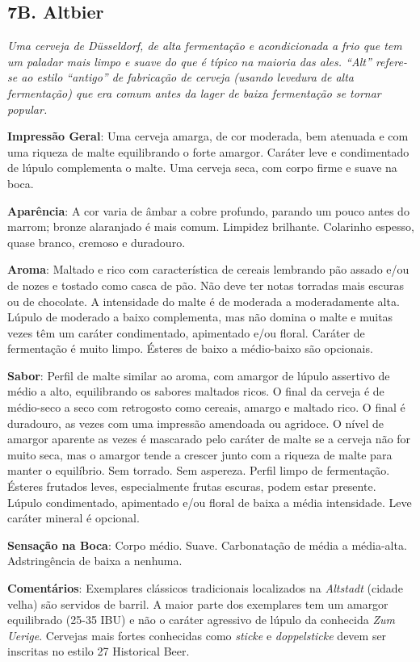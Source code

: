 \subsection*{7B. Altbier}
\textit{Uma cerveja de Düsseldorf, de alta fermentação e acondicionada a frio que tem um paladar mais limpo e suave do que é típico na maioria das ales. “Alt” refere-se ao estilo “antigo” de fabricação de cerveja (usando levedura de alta fermentação) que era comum antes da lager de baixa fermentação se tornar popular.}

\textbf{Impressão Geral}: Uma cerveja amarga, de cor moderada, bem atenuada e com uma riqueza de malte equilibrando o forte amargor. Caráter leve e condimentado de lúpulo complementa o malte. Uma cerveja seca, com corpo firme e suave na boca.

\textbf{Aparência}: A cor varia de âmbar a cobre profundo, parando um pouco antes do marrom; bronze alaranjado é mais comum. Limpidez brilhante. Colarinho espesso, quase branco, cremoso e duradouro.

\textbf{Aroma}: Maltado e rico com característica de cereais lembrando pão assado e/ou de nozes e tostado como casca de pão. Não deve ter notas torradas mais escuras ou de chocolate. A intensidade do malte é de moderada a moderadamente alta. Lúpulo de moderado a baixo complementa, mas não domina o malte e muitas vezes têm um caráter condimentado, apimentado e/ou floral. Caráter de fermentação é muito limpo. Ésteres de baixo a médio-baixo são opcionais.

\textbf{Sabor}: Perfil de malte similar ao aroma, com amargor de lúpulo assertivo de médio a alto, equilibrando os sabores maltados ricos. O final da cerveja é de médio-seco a seco com retrogosto como cereais, amargo e maltado rico. O final é duradouro, as vezes com uma impressão amendoada ou agridoce. O nível de amargor aparente as vezes é mascarado pelo caráter de malte se a cerveja não for muito seca, mas o amargor tende a crescer junto com a riqueza de malte para manter o equilíbrio. Sem torrado. Sem aspereza. Perfil limpo de fermentação. Ésteres frutados leves, especialmente frutas escuras, podem estar presente. Lúpulo condimentado, apimentado e/ou floral de baixa a média intensidade. Leve caráter mineral é opcional.

\textbf{Sensação na Boca}: Corpo médio. Suave. Carbonatação de média a média-alta. Adstringência de baixa a nenhuma.

\textbf{Comentários}: Exemplares clássicos tradicionais localizados na \textit{Altstadt} (cidade velha) são servidos de barril. A maior parte dos exemplares tem um amargor equilibrado (25-35 IBU) e não o caráter agressivo de lúpulo da conhecida \textit{Zum Uerige}. Cervejas mais fortes conhecidas como \textit{sticke} e \textit{doppelsticke} devem ser inscritas no estilo 27 Historical Beer.

